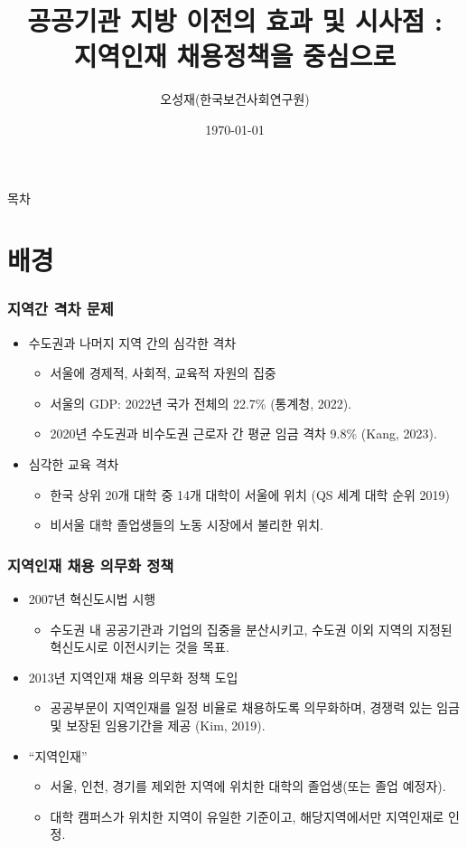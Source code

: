 \documentclass[aspectratio=169,xcolor=dvipsnames,handout]{beamer}
\title{공공기관 지방 이전의 효과 및 시사점 : \\ 지역인재 채용정책을 중심으로}
\subtitle{
}
\author[Oh \& Lee]{오성재(한국보건사회연구원)}
\institute[CNU / SUFE]
{%
  지역격차 완화와 지속가능한 지역경제를 위한 포용정책 세미나
}
\date[Nov, 2024]{\today}
\begin{document}

\frame{\titlepage}

\begin{frame}{목차}
    \small
    \tableofcontents[hideallsubsections]
\end{frame}

\section{배경}
\begin{frame}
    \frametitle{지역간 격차 문제}
    \begin{itemize}[<+->]
        \item 수도권과 나머지 지역 간의 심각한 격차
        \begin{itemize}[<+->]
            \item 서울에 경제적, 사회적, 교육적 자원의 집중
            \item 서울의 GDP\@: 2022년 국가 전체의 22.7\% (통계청, 2022).
            \item 2020년 수도권과 비수도권 근로자 간 평균 임금 격차 9.8\% (Kang, 2023).
        \end{itemize}
        \item 심각한 교육 격차
        \begin{itemize}[<+->]
            \item 한국 상위 20개 대학 중 14개 대학이 서울에 위치 (QS 세계 대학 순위 2019)
            \item 비서울 대학 졸업생들의 노동 시장에서 불리한 위치.
        \end{itemize}
    \end{itemize}
\end{frame}

\begin{frame}
    \frametitle{지역인재 채용 의무화 정책}
    \begin{itemize}[<+->]
        \item 2007년 혁신도시법 시행
        \begin{itemize}[<+->]
            \item 수도권 내 공공기관과 기업의 집중을 분산시키고, 수도권 이외 지역의 지정된 혁신도시로 이전시키는 것을 목표.
        \end{itemize}
        \item 2013년 지역인재 채용 의무화 정책 도입
        \begin{itemize}[<+->]
            \item 공공부문이 지역인재를 일정 비율로 채용하도록 의무화하며, 경쟁력 있는 임금 및 보장된 임용기간을 제공 (Kim, 2019).
        \end{itemize}
        \item ``지역인재''
        \begin{itemize}[<+->]
            \item 서울, 인천, 경기를 제외한 지역에 위치한 대학의 졸업생(또는 졸업 예정자).
            \item 대학 캠퍼스가 위치한 지역이 유일한 기준이고, 해당지역에서만 지역인재로 인정.
        \end{itemize}
    \end{itemize}
\end{frame}
\end{document}
